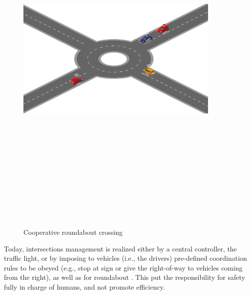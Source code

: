         \begin{figure}[!h]
        \centering 
        \includegraphics[width=10cm,height=18cm,keepaspectratio]{chapters/Chapitre_2/Figures/Driving School.PNG}
        \caption{Cooperative roundabout crossing}
        \label{fig:roundabout}
        \end{figure}

Today, intersections management is realized either by a central controller, the traffic light, or by imposing to vehicles (i.e., the drivers) pre-defined coordination rules to be obeyed (e.g., stop at sign or give the right-of-way to vehicles coming from the right), as well as for roundabout \cite{7562449}. This put the responsibility for safety fully in charge of humans, and not promote efficiency. 

